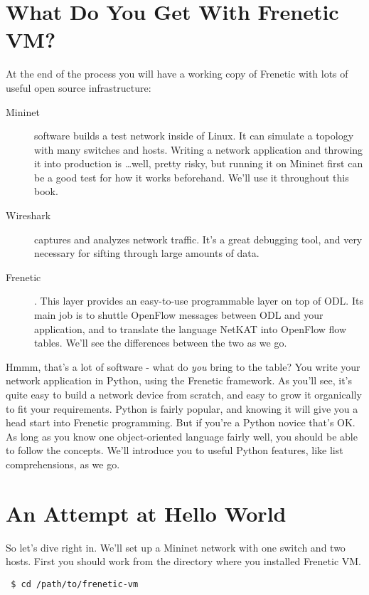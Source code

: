 \section{What Do You Get With Frenetic VM?}

At the end of the process you will have a working copy of Frenetic with lots of useful open source infrastructure:

\begin{description}
\item[Mininet] software builds a test network inside of Linux.  
It can simulate a topology with many switches and hosts.  
Writing a network application and throwing it into production is \ldots well, pretty risky, but running it on Mininet first can be a good test for how it works beforehand.  
We'll use it throughout this book.  
\item[Wireshark] captures and analyzes network traffic.  
It's a great debugging tool, and very necessary for sifting through large amounts of data.
\item[Frenetic].  This layer provides an easy-to-use programmable layer on top of ODL.  Its main job is to shuttle OpenFlow messages between ODL and your application, and to translate the language NetKAT into OpenFlow flow tables.  We'll see the differences between the two as we go.
\end{description}

Hmmm, that's a lot of software - what do {\it you} bring to the table?  You write your network application in Python, using the Frenetic framework.  As you'll see, it's quite easy to build a network device from scratch, and easy to grow it organically to fit your requirements.  Python is fairly popular, and knowing it will give you  a head start into Frenetic programming.  But if you're a Python novice that's OK.  As long as you know one object-oriented language fairly well, you should be able to follow the concepts.  We'll introduce you to useful Python features, like list comprehensions, as we go.  

\section{An Attempt at Hello World}

So let's dive right in.  We'll set up a Mininet network with one switch and two hosts.  First you should work from the directory where you installed Frenetic VM.

\begin{verbatim}
 $ cd /path/to/frenetic-vm
\end{verbatim}
 
